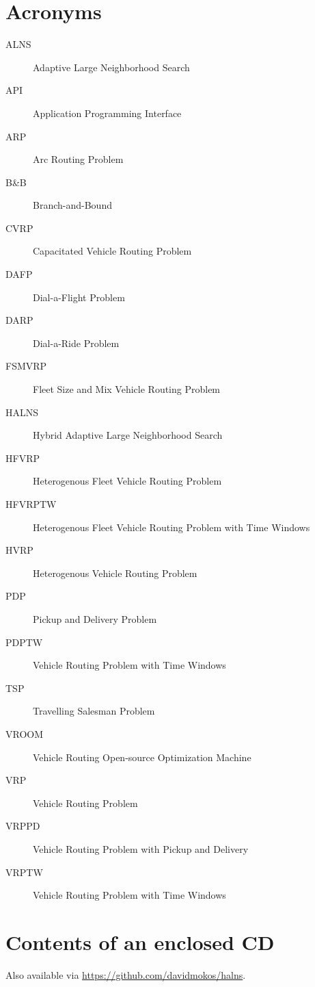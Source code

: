 \documentclass[thesis=M,english]{FITthesis}[2012/10/20]
\begin{document}
\chapter{Acronyms}
\begin{description}
	
	\item[ALNS] Adaptive Large Neighborhood Search
	\item[API] Application Programming Interface
	\item[ARP] Arc Routing Problem
	\item[B\&B] Branch-and-Bound
	\item[CVRP] Capacitated Vehicle Routing Problem
	\item[DAFP] Dial-a-Flight Problem
	\item[DARP] Dial-a-Ride Problem
	\item[FSMVRP] Fleet Size and Mix Vehicle Routing Problem
	\item[HALNS] Hybrid Adaptive Large Neighborhood Search
	\item[HFVRP] Heterogenous Fleet Vehicle Routing Problem
	\item[HFVRPTW] Heterogenous Fleet Vehicle Routing Problem with Time Windows
	\item[HVRP] Heterogenous Vehicle Routing Problem
	\item[PDP] Pickup and Delivery Problem
	\item[PDPTW] Vehicle Routing Problem with Time Windows
	\item[TSP] Travelling Salesman Problem
	\item[VROOM] Vehicle Routing Open-source Optimization Machine
	\item[VRP] Vehicle Routing Problem
	\item[VRPPD] Vehicle Routing Problem with Pickup and Delivery
	\item[VRPTW] Vehicle Routing Problem with Time Windows

\end{description}


\chapter{Contents of an enclosed CD}

Also available via \url{https://github.com/davidmokos/halns}.

\begin{figure}
\end{figure}
\end{document}
